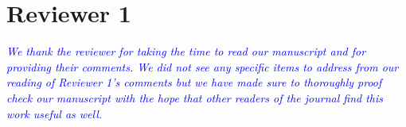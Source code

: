 \section*{Reviewer 1}

\textcolor{blue}{ \emph{ We thank the reviewer for taking the time to read our manuscript and for providing their comments.  We did not see any specific items to address from our reading of Reviewer 1's comments but we have made sure to thoroughly proof check our manuscript with the hope that other readers of the journal find this work useful as well.} }
